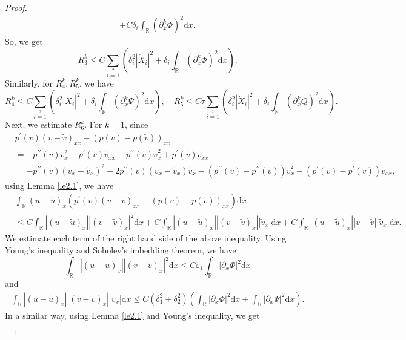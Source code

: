 \documentclass[10pt,reqno]{amsart}
\numberwithin{equation}{section}
\newcommand{\dif}{\mathrm{d}}
\begin{document}
\begin{proof}
\begin{align*}
+C\delta_i\int_\mathbb{R}(\partial_{x}^k\Phi)^2 \dif x.
\end{align*}
So, we get
\[
R^k_3\le C\sum\limits_{i=1}\limits^2\left(\delta_i^2|\dot{X}_i|^2
+\delta_i\int_\mathbb{R}(\partial_{x}^k\Phi)^2 \dif x\right).
\]
Similarly, for $R^k_4,R^k_5$, we have
\[
R^k_4\le C\sum\limits_{i=1}\limits^2\left(\delta_i^2|\dot{X}_i|^2
+\delta_i\int_\mathbb{R}(\partial_{x}^k\Psi)^2 \dif x\right),\quad
R^k_5\le C\tau\sum\limits_{i=1}\limits^2\left(\delta_i^2|\dot{X}_i|^2
+\delta_i\int_\mathbb{R}(\partial_{x}^kQ)^2 \dif x\right).
\]
Next, we estimate $R_6^k$. For $k=1$, since
\begin{align*}
  &p^{\prime}(v)(v-\widetilde{v})_{xx}-(p(v)-p(\widetilde{v}))_{xx}\\
   &=-p^{\prime\prime}(v)v^2_{x}-p^{\prime}(v)\widetilde{v}_{xx}
                    +p^{\prime\prime}(\widetilde{v})\widetilde{v}^2_{x}
                    +p^{\prime}(\widetilde{v})\widetilde{v}_{xx}\\
   &=-p^{\prime\prime}(v)(v_{x}-\widetilde{v}_{x})^2
   -2p^{\prime\prime}(v)(v_{x}-\widetilde{v}_{x})\widetilde{v}_{x}
     -(p^{\prime\prime}(v)-p^{\prime\prime}(\widetilde{v}))\widetilde{v}^2_{x}
     -(p^{\prime}(v)-p^{\prime}(\widetilde{v}))\widetilde{v}_{xx},
\end{align*}
using Lemma \ref{le2.1}, we have
\begin{align*}
 &\int_\mathbb{R}(u-\widetilde{u})_{x}(p^{\prime}(v)(v-\widetilde{v})_{xx}-(p(v)-p(\widetilde{v}))_{xx})\dif x\\
      &\leq C\int_\mathbb{R}|(u-\widetilde{u})_{x}||(v-\widetilde{v})_{x}|^2\dif x
      +C\int_\mathbb{R}|(u-\widetilde{u})_{x}||(v-\widetilde{v})_{x}||\widetilde{v}_{x}|\dif x
      +C\int_\mathbb{R}|(u-\widetilde{u})_{x}||v-\widetilde{v}||\widetilde{v}_{x}|\dif x.
\end{align*}
We estimate each term of the right hand side of the above inequality. Using Young's inequality and Sobolev's imbedding theorem, we have
\[
\int_\mathbb{R}|(u-\widetilde{u})_{x}||(v-\widetilde{v})_{x}|^2\dif x\leq
 C\varepsilon_1\int_\mathbb{R}|\partial_{x}\Phi|^2\dif x
\]
and
\begin{align*}
\int_\mathbb{R}|(u-\widetilde{u})_{x}||(v-\widetilde{v})_{x}||\widetilde{v}_{x}|\dif x\leq C(\delta_1^2+\delta_2^2)
(\int_\mathbb{R}|\partial_{x}\Phi|^2\dif x+\int_\mathbb{R}|\partial_{x}\Psi|^2\dif x).
\end{align*}
In a similar way, using Lemma \ref{le2.1} and Young's inequality, we get
\begin{align*}

\end{align*}
\end{proof}
\end{document}
